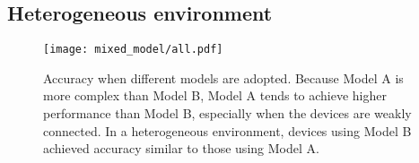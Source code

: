 \documentclass[journal]{IEEEtran}
\begin{document}


\subsection{Heterogeneous environment}
\begin{figure}[!t]
\centering
\texttt{[image: mixed\_model/all.pdf]}
\caption{Accuracy when different models are adopted.
Because Model A is more complex than Model B, Model A tends to achieve higher performance than Model B,
especially when the devices are weakly connected.
In a heterogeneous environment, devices using Model B achieved accuracy similar to those using Model A.
}
\label{fig:eval_mixedmodel}
\end{figure}
\end{document}
